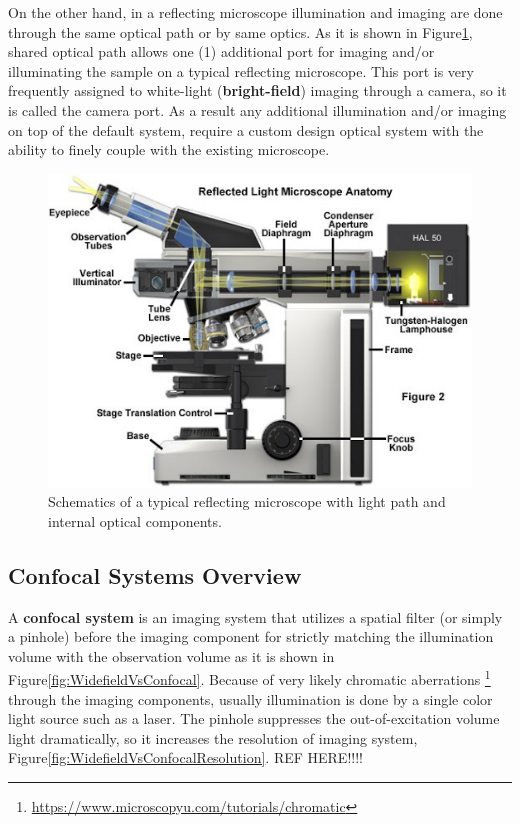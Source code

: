 On the other hand, in a reflecting microscope illumination and imaging are done through the
same optical path or by same optics. As it is shown in Figure\ref{fig:ReflectingMicroscope},
shared optical path allows one (1) additional port for imaging and/or illuminating the sample
on a typical reflecting microscope. This port is very frequently assigned to white-light
(\textbf{bright-field}) imaging through a camera, so it is called the camera port. As a result
any additional illumination and/or imaging on top of the default system, require a custom
design optical system with the ability to finely couple with the existing microscope.

\begin{figure}[H]
	\centering
	\includegraphics[angle=0,origin=c,width = 1.0\linewidth]{Section_Microscope/Figures/ReflectingMicroscope.jpeg}
	\caption{Schematics of a typical reflecting microscope with light path and internal 
		optical components.}
	\label{fig:ReflectingMicroscope}
\end{figure}

\subsection{Confocal Systems Overview}\label{sec:confocalsystems}
A \textbf{confocal system} is an imaging system that utilizes a spatial filter
(or simply a pinhole) before the imaging component for strictly matching the illumination 
volume with the observation volume as it is shown in Figure\ref{fig:WidefieldVsConfocal}. Because 
of very likely chromatic aberrations \footnote{\url{https://www.microscopyu.com/tutorials/chromatic}} 
through the imaging components, usually illumination is done by a single color light source such as 
a laser. The pinhole suppresses the out-of-excitation volume light dramatically, so it increases 
the resolution of imaging system, Figure\ref{fig:WidefieldVsConfocalResolution}. REF HERE!!!!

